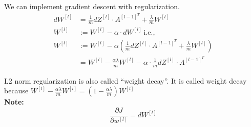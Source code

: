 \documentclass[letterpaper,12pt,notitlepage,twoside]{report}
\begin{document}
We can implement gradient descent with regularization. 
\begin{align*}
dW^{[l]} &= \frac{1}{m} dZ^{[l]} \cdot A^{[l-1]^T} + \frac{\lambda}{m} W^{[l]} \\
W^{[l]} &:= W^{[l]} - \alpha \cdot dW^{[l]} ~\text{i.e.,} \\
W^{[l]} &:= W^{[l]} - \alpha \left( \frac{1}{m} dZ^{[l]} \cdot A^{[l-1]^T} + \frac{\lambda}{m} W^{[l]} \right) \\
	&= W^{[l]} - \frac{\alpha \lambda}{m} W^{[l]} - \alpha \cdot \frac{1}{m} dZ^{[l]} \cdot A^{[l-1]^T} 
\end{align*}

L2 norm regularization is also called ``weight decay''. It is called weight decay because \( W^{[l]} - \frac{\alpha \lambda}{m} W^{[l]} = (1 - \frac{\alpha \lambda}{m} ) W^{[l]} \) \\
\textbf{Note:} \\
\[ \frac{\partial J}{\partial w^{[l]}} = dW^{[l]} \]

\end{document}

